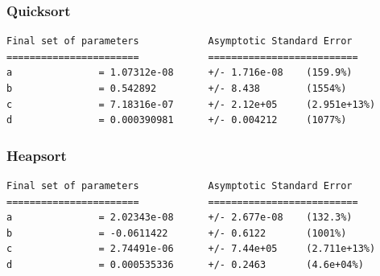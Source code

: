 \documentclass[a4]{article}
\begin{document}
\subsubsection{Quicksort}

\begin{verbatim}
Final set of parameters            Asymptotic Standard Error
=======================            ==========================
a               = 1.07312e-08      +/- 1.716e-08    (159.9%)
b               = 0.542892         +/- 8.438        (1554%)
c               = 7.18316e-07      +/- 2.12e+05     (2.951e+13%)
d               = 0.000390981      +/- 0.004212     (1077%)
\end{verbatim}

\begin{figure}[H]
  \centering
\end{figure}

\vspace{-10mm}

\subsubsection{Heapsort}

\begin{verbatim}
Final set of parameters            Asymptotic Standard Error
=======================            ==========================
a               = 2.02343e-08      +/- 2.677e-08    (132.3%)
b               = -0.0611422       +/- 0.6122       (1001%)
c               = 2.74491e-06      +/- 7.44e+05     (2.711e+13%)
d               = 0.000535336      +/- 0.2463       (4.6e+04%)
\end{verbatim}

\begin{figure}[H] \centering
{}
\end{figure}
\end{document}
